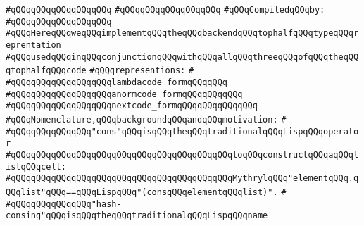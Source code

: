 \verb|#qQQqqQQqqQQqqQQqqQQq|\newline
\verb|#qQQqqQQqqQQqqQQqqQQq|\newline
\newline
\verb|#qQQqCompiledqQQqby:|\newline
\verb|#qQQqqQQqqQQqqQQqqQQq|\newline
\newline
\verb|#qQQqHereqQQqweqQQqimplementqQQqtheqQQqbackendqQQqtophalfqQQqtypeqQQqreprentation|\newline
\verb|#qQQqusedqQQqinqQQqconjunctionqQQqwithqQQqallqQQqthreeqQQqofqQQqtheqQQqtophalfqQQqcode|\newline
\verb|#qQQqrepresentions:|\newline
\verb|#|\newline
\verb|#qQQqqQQqqQQqqQQqqQQqlambdacode_formqQQqqQQq|\newline
\verb|#qQQqqQQqqQQqqQQqqQQqanormcode_formqQQqqQQqqQQq|\newline
\verb|#qQQqqQQqqQQqqQQqqQQqnextcode_formqQQqqQQqqQQqqQQq|\newline
\newline
\verb|#qQQqNomenclature,qQQqbackgroundqQQqandqQQqmotivation:|\newline
\verb|#|\newline
\verb|#qQQqqQQqqQQqqQQq"cons"qQQqisqQQqtheqQQqtraditionalqQQqLispqQQqoperator|\newline
\verb|#qQQqqQQqqQQqqQQqqQQqqQQqqQQqqQQqqQQqqQQqqQQqtoqQQqconstructqQQqaqQQqlistqQQqcell:|\newline
\verb|#qQQqqQQqqQQqqQQqqQQqqQQqqQQqqQQqqQQqqQQqqQQqMythrylqQQq"elementqQQq.qQQqlist"qQQq==qQQqLispqQQq"(consqQQqelementqQQqlist)".|\newline
\verb|#|\newline
\verb|#qQQqqQQqqQQqqQQq"hash-consing"qQQqisqQQqtheqQQqtraditionalqQQqLispqQQqname|\newline

